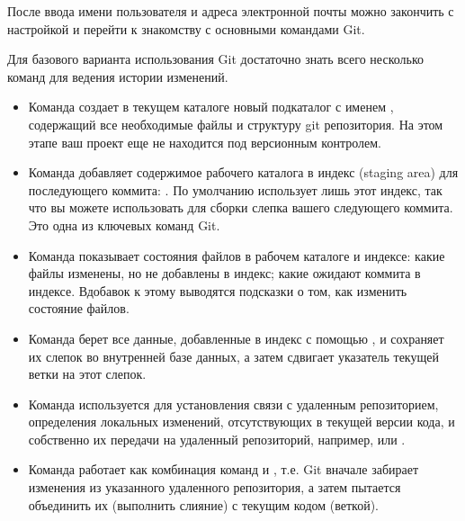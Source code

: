 \documentclass[letterpaper,10pt,russian]{sphinxmanual}
\begin{document}
\sphinxAtStartPar
После ввода имени пользователя и адреса электронной почты можно закончить с настройкой и перейти к знакомству с основными командами Git.

\sphinxAtStartPar
Для базового варианта использования Git достаточно знать всего несколько команд для ведения истории изменений.
\begin{itemize}
\item {} 
\sphinxAtStartPar
Команда  создает в текущем каталоге новый подкаталог с именем , содержащий все необходимые файлы и структуру git репозитория. На этом этапе ваш проект еще не находится под версионным контролем.

\item {} 
\sphinxAtStartPar
Команда  добавляет содержимое рабочего каталога в индекс (staging area) для последующего коммита: . По умолчанию  использует лишь этот индекс, так что вы можете использовать  для сборки слепка вашего следующего коммита. Это одна из ключевых команд Git.

\item {} 
\sphinxAtStartPar
Команда  показывает состояния файлов в рабочем каталоге и индексе: какие файлы изменены, но не добавлены в индекс; какие ожидают коммита в индексе. Вдобавок к этому выводятся подсказки о том, как изменить состояние файлов.

\item {} 
\sphinxAtStartPar
Команда  берет все данные, добавленные в индекс с помощью , и сохраняет их слепок во внутренней базе данных, а затем сдвигает указатель текущей ветки на этот слепок.

\item {} 
\sphinxAtStartPar
Команда  используется для установления связи с удаленным репозиторием, определения локальных изменений, отсутствующих в текущей версии кода, и собственно их передачи на удаленный репозиторий, например,  или .

\item {} 
\sphinxAtStartPar
Команда  работает как комбинация команд  и , т.е. Git вначале забирает изменения из указанного удаленного репозитория, а затем пытается объединить их (выполнить слияние) с текущим кодом (веткой).

\end{itemize}
\end{document}
